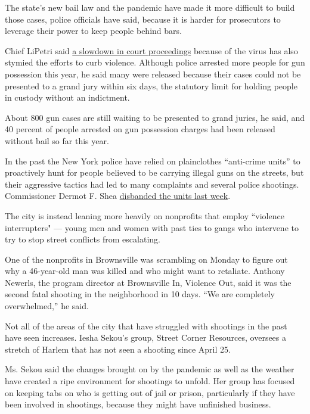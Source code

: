 The state's new bail law and the pandemic have made it more difficult to
build those cases, police officials have said, because it is harder for
prosecutors to leverage their power to keep people behind bars.

Chief LiPetri said
\href{https://www.nytimes3xbfgragh.onion/2020/06/22/nyregion/coronavirus-new-york-courts.html}{a
slowdown in court proceedings} because of the virus has also stymied the
efforts to curb violence. Although police arrested more people for gun
possession this year, he said many were released because their cases
could not be presented to a grand jury within six days, the statutory
limit for holding people in custody without an indictment.

About 800 gun cases are still waiting to be presented to grand juries,
he said, and 40 percent of people arrested on gun possession charges had
been released without bail so far this year.

In the past the New York police have relied on plainclothes ``anti-crime
units'' to proactively hunt for people believed to be carrying illegal
guns on the streets, but their aggressive tactics had led to many
complaints and several police shootings. Commissioner Dermot F. Shea
\href{https://www.nytimes3xbfgragh.onion/2020/06/15/nyregion/nypd-plainclothes-cops.html}{disbanded
the units last week}.

The city is instead leaning more heavily on nonprofits that employ
``violence interrupters" --- young men and women with past ties to gangs
who intervene to try to stop street conflicts from escalating.

One of the nonprofits in Brownsville was scrambling on Monday to figure
out why a 46-year-old man was killed and who might want to retaliate.
Anthony Newerls, the program director at Brownsville In, Violence Out,
said it was the second fatal shooting in the neighborhood in 10 days.
``We are completely overwhelmed,'' he said.

Not all of the areas of the city that have struggled with shootings in
the past have seen increases. Iesha Sekou's group, Street Corner
Resources, oversees a stretch of Harlem that has not seen a shooting
since April 25.

Ms. Sekou said the changes brought on by the pandemic as well as the
weather have created a ripe environment for shootings to unfold. Her
group has focused on keeping tabs on who is getting out of jail or
prison, particularly if they have been involved in shootings, because
they might have unfinished business.

